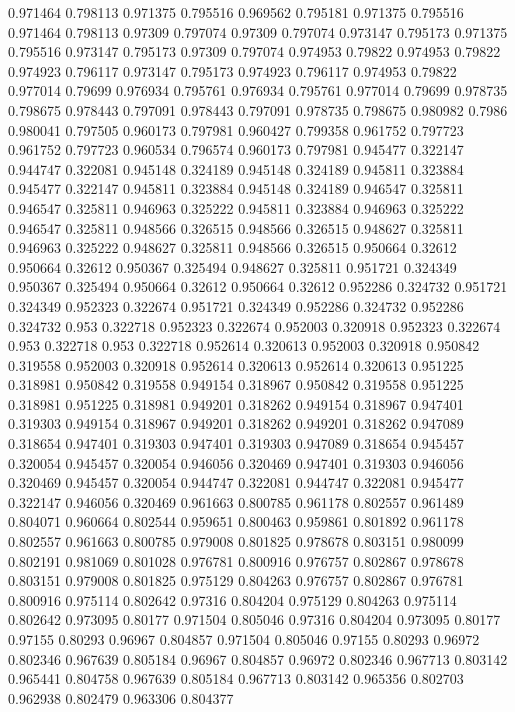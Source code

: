 0.971464 0.798113
0.971375 0.795516
0.969562 0.795181
0.971375 0.795516
0.971464 0.798113
0.97309 0.797074
0.97309 0.797074
0.973147 0.795173
0.971375 0.795516
0.973147 0.795173
0.97309 0.797074
0.974953 0.79822
0.974953 0.79822
0.974923 0.796117
0.973147 0.795173
0.974923 0.796117
0.974953 0.79822
0.977014 0.79699
0.976934 0.795761
0.976934 0.795761
0.977014 0.79699
0.978735 0.798675
0.978443 0.797091
0.978443 0.797091
0.978735 0.798675
0.980982 0.7986
0.980041 0.797505
0.960173 0.797981
0.960427 0.799358
0.961752 0.797723
0.961752 0.797723
0.960534 0.796574
0.960173 0.797981
0.945477 0.322147
0.944747 0.322081
0.945148 0.324189
0.945148 0.324189
0.945811 0.323884
0.945477 0.322147
0.945811 0.323884
0.945148 0.324189
0.946547 0.325811
0.946547 0.325811
0.946963 0.325222
0.945811 0.323884
0.946963 0.325222
0.946547 0.325811
0.948566 0.326515
0.948566 0.326515
0.948627 0.325811
0.946963 0.325222
0.948627 0.325811
0.948566 0.326515
0.950664 0.32612
0.950664 0.32612
0.950367 0.325494
0.948627 0.325811
0.951721 0.324349
0.950367 0.325494
0.950664 0.32612
0.950664 0.32612
0.952286 0.324732
0.951721 0.324349
0.952323 0.322674
0.951721 0.324349
0.952286 0.324732
0.952286 0.324732
0.953 0.322718
0.952323 0.322674
0.952003 0.320918
0.952323 0.322674
0.953 0.322718
0.953 0.322718
0.952614 0.320613
0.952003 0.320918
0.950842 0.319558
0.952003 0.320918
0.952614 0.320613
0.952614 0.320613
0.951225 0.318981
0.950842 0.319558
0.949154 0.318967
0.950842 0.319558
0.951225 0.318981
0.951225 0.318981
0.949201 0.318262
0.949154 0.318967
0.947401 0.319303
0.949154 0.318967
0.949201 0.318262
0.949201 0.318262
0.947089 0.318654
0.947401 0.319303
0.947401 0.319303
0.947089 0.318654
0.945457 0.320054
0.945457 0.320054
0.946056 0.320469
0.947401 0.319303
0.946056 0.320469
0.945457 0.320054
0.944747 0.322081
0.944747 0.322081
0.945477 0.322147
0.946056 0.320469
0.961663 0.800785
0.961178 0.802557
0.961489 0.804071
0.960664 0.802544
0.959651 0.800463
0.959861 0.801892
0.961178 0.802557
0.961663 0.800785
0.979008 0.801825
0.978678 0.803151
0.980099 0.802191
0.981069 0.801028
0.976781 0.800916
0.976757 0.802867
0.978678 0.803151
0.979008 0.801825
0.975129 0.804263
0.976757 0.802867
0.976781 0.800916
0.975114 0.802642
0.97316 0.804204
0.975129 0.804263
0.975114 0.802642
0.973095 0.80177
0.971504 0.805046
0.97316 0.804204
0.973095 0.80177
0.97155 0.80293
0.96967 0.804857
0.971504 0.805046
0.97155 0.80293
0.96972 0.802346
0.967639 0.805184
0.96967 0.804857
0.96972 0.802346
0.967713 0.803142
0.965441 0.804758
0.967639 0.805184
0.967713 0.803142
0.965356 0.802703
0.962938 0.802479
0.963306 0.804377
